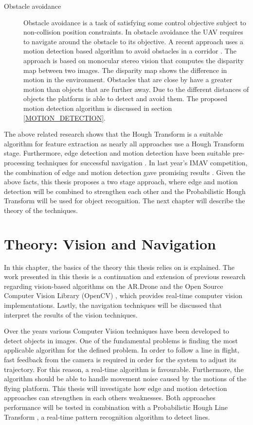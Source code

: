 \documentclass[a4paper]{article}
\begin{document}
\begin{description}
\item[Obstacle avoidance] Obstacle avoidance is a task of satisfying some control objective subject to non-collision position constraints. In obstacle avoidance the UAV requires to navigate around the obstacle to its objective. A recent approach uses a motion detection based algorithm to avoid obstacles in a corridor \cite{Jurriaans2011}. The approach is based on monocular stereo vision that computes the disparity map between two images. The disparity map shows the difference in motion in the environment. Obstacles that are close by have a greater motion than objects that are further away. Due to the different distances of objects the platform is able to detect and avoid them. The proposed motion detection algorithm is discussed in section \ref{MOTION_DETECTION}.
\end{description}

The above related research shows that the Hough Transform is a suitable algorithm for feature extraction as nearly all approaches use a Hough Transform stage. Furthermore, edge detection and motion detection have been suitable pre-processing techniques for successful navigation \cite{Bills2011, Jurriaans2011}. In last year's IMAV competition, the combination of edge and motion detection gave promising results \cite{Gerke2011}. Given the above facts, this thesis proposes a two stage approach, where edge and motion detection will be combined to strengthen each other and the Probabilistic Hough Transform will be used for object recognition. The next chapter will describe the theory of the techniques.

\newpage
\section{Theory: Vision and Navigation}
\label{THEORY}
In this chapter, the basics of the theory this thesis relies on is explained. The work presented in this thesis is a continuation and extension of previous research regarding vision-based algorithms on the AR.Drone \cite{Jurriaans2011} and the Open Source Computer Vision Library (OpenCV) \cite{Bradski2008}, which provides real-time computer vision implementations. Lastly, the navigation techniques will be discussed that interpret the results of the vision techniques.

Over the years various Computer Vision techniques have been developed to detect objects in images. One of the fundamental problems is finding the most applicable algorithm for the defined problem. In order to follow a line in flight, fast feedback from the camera is required in order for the system to adjust its trajectory. For this reason, a real-time algorithm is favourable. Furthermore, the algorithm should be able to handle movement noise caused by the motions of the flying platform. This thesis will investigate how edge and motion detection approaches can strengthen in each others weaknesses. Both approaches performance will be tested in combination with a Probabilistic Hough Line Transform \cite{Kiryati1991}, a real-time pattern recognition algorithm to detect lines.
\end{document}
